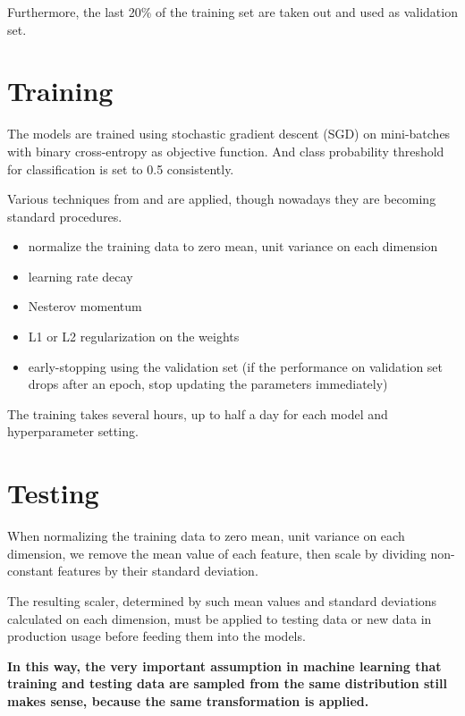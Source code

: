 \documentclass[11pt,a4paper]{report}
\begin{document}
Furthermore, the last 20\% of the training set are taken out and used as validation set.

\section{Training}

The models are trained using stochastic gradient descent (SGD) on mini-batches with binary cross-entropy as objective function.
And class probability threshold for classification is set to 0.5 consistently.

Various techniques from \parencite{lecun2012efficient} and \parencite{orr2003neural} are applied, though nowadays they are becoming standard procedures.

\begin{itemize}
  \item normalize the training data to zero mean, unit variance on each dimension
  \item learning rate decay
  \item Nesterov momentum \parencite{nesterov1983method}
  \item L1 or L2 regularization on the weights
  \item early-stopping using the validation set (if the performance on validation set drops after an epoch, stop updating the parameters immediately)
\end{itemize}

The training takes several hours, up to half a day for each model and hyperparameter setting.

\section{Testing}

When normalizing the training data to zero mean, unit variance on each dimension, we remove the mean value of each feature, then scale by dividing non-constant features by their standard deviation.

The resulting scaler, determined by such mean values and standard deviations calculated on each dimension, must be applied to testing data or new data in production usage before feeding them into the models.

\bigskip

\textbf{In this way, the very important assumption in machine learning that training and testing data are sampled from the same distribution still makes sense, because the same transformation is applied.}
\end{document}
